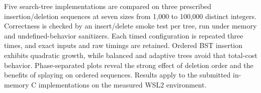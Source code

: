 Five search-tree implementations are compared on three prescribed insertion/deletion sequences at seven sizes from 1,000 to 100,000 distinct integers. Correctness is checked by an insert/delete smoke test per tree, run under memory and undefined-behavior sanitizers. Each timed configuration is repeated three times, and exact inputs and raw timings are retained. Ordered BST insertion exhibits quadratic growth, while balanced and adaptive trees avoid that total-cost behavior. Phase-separated plots reveal the strong effect of deletion order and the benefits of splaying on ordered sequences. Results apply to the submitted in-memory C implementations on the measured WSL2 environment.
